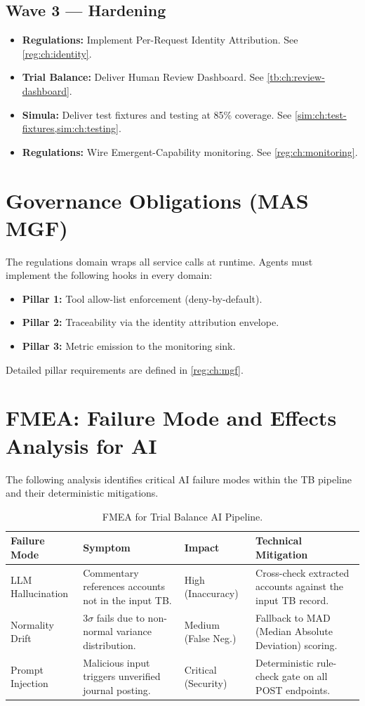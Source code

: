 \documentclass[11pt,a4paper,twoside]{report}
\begin{document}
\subsection*{Wave 3 --- Hardening}
\begin{itemize}
\item \textbf{Regulations:} Implement Per-Request Identity Attribution. See \cref{reg:ch:identity}.
\item \textbf{Trial Balance:} Deliver Human Review Dashboard. See \cref{tb:ch:review-dashboard}.
\item \textbf{Simula:} Deliver test fixtures and testing at 85\% coverage. See \cref{sim:ch:test-fixtures,sim:ch:testing}.
\item \textbf{Regulations:} Wire Emergent-Capability monitoring. See \cref{reg:ch:monitoring}.
\end{itemize}

\section{Governance Obligations (MAS MGF)}
The regulations domain wraps all service calls at runtime. Agents must implement the following hooks in every domain:
\begin{itemize}
\item \textbf{Pillar 1:} Tool allow-list enforcement (deny-by-default).
\item \textbf{Pillar 2:} Traceability via the identity attribution envelope.
\item \textbf{Pillar 3:} Metric emission to the monitoring sink.
\end{itemize}
Detailed pillar requirements are defined in \cref{reg:ch:mgf}.

\section{FMEA: Failure Mode and Effects Analysis for AI}
\label{sec:fmea-ai}

The following analysis identifies critical AI failure modes within the TB pipeline and their deterministic mitigations.

\begin{table}[htbp]
\centering
\footnotesize
\caption{FMEA for Trial Balance AI Pipeline.}
\label{tab:tb-fmea}
\begin{tabularx}{\textwidth}{@{}l X X X@{}}
\toprule
\textbf{Failure Mode} & \textbf{Symptom} & \textbf{Impact} & \textbf{Technical Mitigation} \\
\midrule
LLM Hallucination & Commentary references accounts not in the input TB. & High (Inaccuracy) & Cross-check extracted accounts against the input TB record. \\
Normality Drift & $3\sigma$ fails due to non-normal variance distribution. & Medium (False Neg.) & Fallback to MAD (Median Absolute Deviation) scoring. \\
Prompt Injection & Malicious input triggers unverified journal posting. & Critical (Security) & Deterministic rule-check gate on all POST endpoints. \\
\bottomrule
\end{tabularx}
\end{table}
\end{document}
